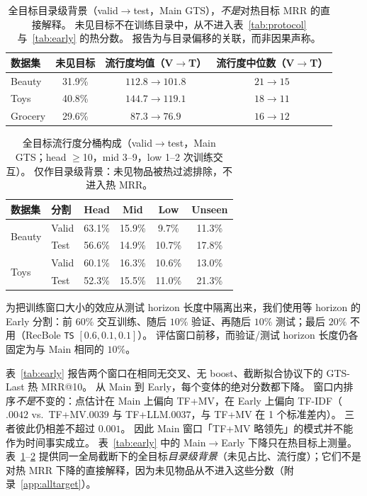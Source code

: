 \documentclass[sigconf,natbib=true,anonymous]{acmart}
\newcommand{\tfidf}{\textsc{TF-IDF}\xspace}
\newcommand{\tfllm}{\textsc{TF+LLM}\xspace}
\newcommand{\tfmv}{\textsc{TF+MV}\xspace}
\begin{document}
\begin{table}[t]
\centering
\caption{%
全目标目录级背景（valid$\to$test，Main GTS），\emph{不是}对热目标 MRR 的直接解释。
未见目标不在训练目录中，从不进入表~\ref{tab:protocol} 与~\ref{tab:early} 的热分数。
报告为与目录偏移的关联，而非因果声称。%
}
\label{tab:shift}
\small
\setlength{\tabcolsep}{4pt}
\begin{tabular}{@{}lccc@{}}
\toprule
数据集 & 未见目标 & 流行度均值（V$\to$T） & 流行度中位数（V$\to$T） \\
\midrule
Beauty  & 31.9\% & $112.8 \to 101.8$ & $21 \to 15$ \\
Toys    & 40.8\% & $144.7 \to 119.1$ & $18 \to 11$ \\
Grocery & 29.6\% & $87.3 \to 76.9$ & $16 \to 12$ \\
\bottomrule
\end{tabular}
\end{table}

\begin{table}[t]
\centering
\caption{%
全目标流行度分桶构成（valid$\to$test，Main GTS；head $\ge$10，mid 3--9，low 1--2 次训练交互）。
仅作目录级背景：未见物品被热过滤排除，不进入热 MRR。%
}
\label{tab:bucket}
\small
\setlength{\tabcolsep}{3.5pt}
\begin{tabular}{@{}llcccc@{}}
\toprule
数据集 & 分割 & Head & Mid & Low & Unseen \\
\midrule
\multirow{2}{*}{Beauty}
 & Valid & 63.1\% & 15.9\% & 9.7\% & 11.3\% \\
 & Test  & 56.6\% & 14.9\% & 10.7\% & 17.8\% \\
\midrule
\multirow{2}{*}{Toys}
 & Valid & 60.1\% & 16.3\% & 10.6\% & 13.0\% \\
 & Test  & 52.3\% & 15.5\% & 11.0\% & 21.3\% \\
\bottomrule
\end{tabular}
\end{table}

为把训练窗口大小的效应从测试 horizon 长度中隔离出来，我们使用等 horizon 的 Early 分割：前 $60\%$ 交互训练、随后 $10\%$ 验证、再随后 $10\%$ 测试；最后 $20\%$ 不用（RecBole \texttt{TS} $[0.6,0.1,0.1]$）。
评估窗口前移，而验证/测试 horizon 长度仍各固定为与 Main 相同的 $10\%$。

表~\ref{tab:early} 报告两个窗口在相同无交叉、无 boost、截断拟合协议下的 GTS-Last 热 MRR@10。
从 Main 到 Early，每个变体的绝对分数都下降。
窗口内排序\emph{不是}不变的：点估计在 Main 上偏向 \tfmv，在 Early 上偏向 \tfidf（$.0042$ vs.\ \tfmv $.0039$ 与 \tfllm $.0037$，与 \tfmv 在 1 个标准差内）。
三者彼此仍相差不超过 $0.001$。
因此 Main 窗口「\tfmv 略领先」的模式并不能作为时间事实成立。
表~\ref{tab:early} 中的 Main$\to$Early 下降只在热目标上测量。
表~\ref{tab:shift}--\ref{tab:bucket} 提供同一全局截断下的全目标\emph{目录级背景}（未见占比、流行度）；它们不是对热 MRR 下降的直接解释，因为未见物品从不进入这些分数（附录~\ref{app:alltarget}）。
\end{document}
